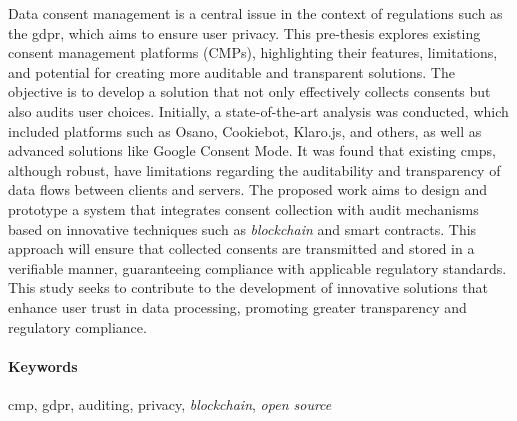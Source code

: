 Data consent management is a central issue in the context of regulations such as the \acrfull{gdpr}, which aims to ensure user privacy. This pre-thesis explores existing consent management platforms (CMPs), highlighting their features, limitations, and potential for creating more auditable and transparent solutions. The objective is to develop a solution that not only effectively collects consents but also audits user choices. Initially, a state-of-the-art analysis was conducted, which included platforms such as Osano, Cookiebot, Klaro.js, and others, as well as advanced solutions like Google Consent Mode. It was found that existing \acrshort{cmp}s, although robust, have limitations regarding the auditability and transparency of data flows between clients and servers. The proposed work aims to design and prototype a system that integrates consent collection with audit mechanisms based on innovative techniques such as \textit{blockchain} and smart contracts. This approach will ensure that collected consents are transmitted and stored in a verifiable manner, guaranteeing compliance with applicable regulatory standards. This study seeks to contribute to the development of innovative solutions that enhance user trust in data processing, promoting greater transparency and regulatory compliance.

\paragraph{Keywords} \acrshort{cmp}, \acrshort{gdpr}, auditing, privacy, \textit{blockchain}, \textit{open source}

\cleardoublepage
